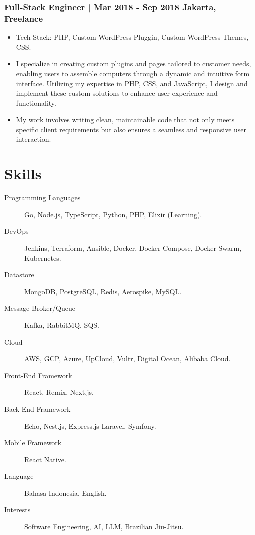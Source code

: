 \documentclass[11pt]{article}
\begin{document}
\subsubsection{Full-Stack Engineer | Mar 2018 - Sep 2018 \hfill Jakarta, Freelance}
\begin{itemize}
    \item Tech Stack: PHP, Custom WordPress Pluggin, Custom WordPress Themes, CSS.
    \item I specialize in creating custom plugins and pages tailored to customer needs, enabling users to assemble computers through a dynamic and intuitive form interface. Utilizing my expertise in PHP, CSS, and JavaScript, I design and implement these custom solutions to enhance user experience and functionality.
    \item My work involves writing clean, maintainable code that not only meets specific client requirements but also ensures a seamless and responsive user interaction.
\end{itemize}

\section{Skills}
\begin{description}
    \item[Programming Languages] Go, Node.js, TypeScript, Python, PHP, Elixir (Learning).
    \item[DevOps] Jenkins, Terraform, Ansible, Docker, Docker Compose, Docker Swarm, Kubernetes.
    \item[Datastore] MongoDB, PostgreSQL, Redis, Aerospike, MySQL.
    \item[Message Broker/Queue] Kafka, RabbitMQ, SQS.
    \item[Cloud] AWS, GCP, Azure, UpCloud, Vultr, Digital Ocean, Alibaba Cloud.
    \item[Front-End Framework] React, Remix, Next.js.
    \item[Back-End Framework] Echo, Nest.js, Express.js Laravel, Symfony.
    \item[Mobile Framework] React Native.
    \item[Language] Bahasa Indonesia, English.
    \item[Interests] Software Engineering, AI, LLM, Brazilian Jiu-Jitsu.
\end{description}
\end{document}

